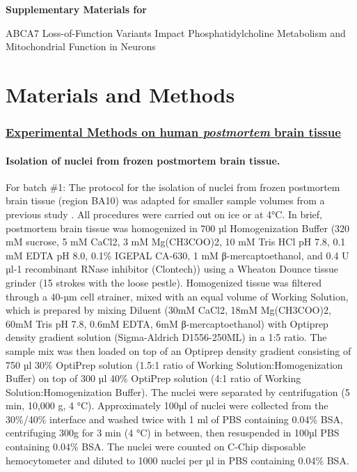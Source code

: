 \documentclass[12pt]{article}
\begin{document}
 \clearpage

\restoregeometry

\label{sec:supplementary}
\begin{titlepage}
    \centering
    {\Large \bfseries Supplementary Materials for\par}
    \vspace{1em}
    {\large ABCA7 Loss-of-Function Variants Impact Phosphatidylcholine Metabolism and Mitochondrial Function in Neurons\par}
    \vfill
\end{titlepage}
 \clearpage

\linenumbers
\onehalfspacing

\section{Materials and Methods}
\label{sec:materials_and_methods}
\subsubsection{\underline{Experimental Methods on human \textit{postmortem} brain tissue}}

\paragraph{Isolation of nuclei from frozen postmortem brain tissue.}
For batch \#1: The protocol for the isolation of nuclei from frozen postmortem brain tissue (region BA10) was adapted for smaller sample volumes from a previous study \cite{Mathys2019-wb}. All procedures were carried out on ice or at 4°C. In brief, postmortem brain tissue was homogenized in 700 µl Homogenization Buffer (320 mM sucrose, 5 mM CaCl2, 3 mM Mg(CH3COO)2, 10 mM Tris HCl pH 7.8, 0.1 mM EDTA pH 8.0, 0.1\% IGEPAL CA-630, 1 mM β-mercaptoethanol, and 0.4 U µl-1 recombinant RNase inhibitor (Clontech)) using a Wheaton Dounce tissue grinder (15 strokes with the loose pestle). Homogenized tissue was filtered through a 40-µm cell strainer, mixed with an equal volume of Working Solution, which is prepared by mixing Diluent (30mM CaCl2, 18mM Mg(CH3COO)2, 60mM Tris pH 7.8, 0.6mM EDTA, 6mM β-mercaptoethanol) with Optiprep density gradient solution (Sigma-Aldrich D1556-250ML) in a 1:5 ratio. The sample mix was then loaded on top of an Optiprep density gradient consisting of 750 µl 30\% OptiPrep solution (1.5:1 ratio of Working Solution:Homogenization Buffer) on top of 300 µl 40\% OptiPrep solution (4:1 ratio of Working Solution:Homogenization Buffer). The nuclei were separated by centrifugation (5 min, 10,000 g, 4 °C). Approximately 100µl of nuclei were collected from the 30\%/40\% interface and washed twice with 1 ml of PBS containing 0.04\% BSA, centrifuging 300g for 3 min (4 °C) in between, then resuspended in 100µl PBS containing 0.04\% BSA. The nuclei were counted on C-Chip disposable hemocytometer and diluted to 1000 nuclei per µl in PBS containing 0.04\% BSA. 
\end{document}
